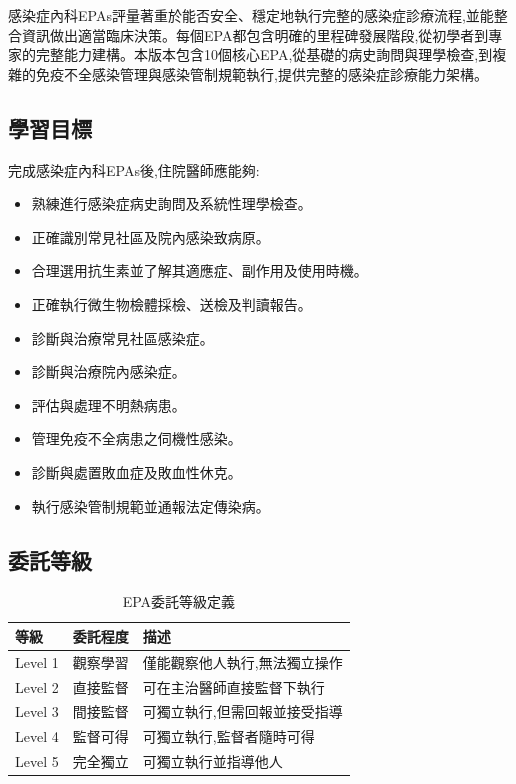 \documentclass[12pt,a4paper]{article}
\newcommand{\note}[1]{
    \par
    \noindent
    \begin{tcolorbox}[
        colback=id_orange!5!white,
        colframe=id_orange,
        title=\textbf{重點提醒},
        fonttitle=\bfseries,
        boxrule=0.5pt,
        arc=3pt,
        left=6pt,
        right=6pt,
        top=6pt,
        bottom=6pt
    ]
    #1
    \end{tcolorbox}
}
\begin{document}
\vspace{0.5cm}
\note{
感染症內科EPAs評量著重於能否安全、穩定地執行完整的感染症診療流程,並能整合資訊做出適當臨床決策。每個EPA都包含明確的里程碑發展階段,從初學者到專家的完整能力建構。本版本包含10個核心EPA,從基礎的病史詢問與理學檢查,到複雜的免疫不全感染管理與感染管制規範執行,提供完整的感染症診療能力架構。
}

\subsection{學習目標}
完成感染症內科EPAs後,住院醫師應能夠:
\begin{itemize}[nosep]
    \item 熟練進行感染症病史詢問及系統性理學檢查。
    \item 正確識別常見社區及院內感染致病原。
    \item 合理選用抗生素並了解其適應症、副作用及使用時機。
    \item 正確執行微生物檢體採檢、送檢及判讀報告。
    \item 診斷與治療常見社區感染症。
    \item 診斷與治療院內感染症。
    \item 評估與處理不明熱病患。
    \item 管理免疫不全病患之伺機性感染。
    \item 診斷與處置敗血症及敗血性休克。
    \item 執行感染管制規範並通報法定傳染病。
\end{itemize}

\subsection{委託等級}
\begin{table}[h]
    \centering
    \caption{EPA委託等級定義}
    \begin{tabular}{p{2cm} p{3cm} p{9cm}}
        \toprule
        \textbf{等級} & \textbf{委託程度} & \textbf{描述} \\
        \midrule
        Level 1 & 觀察學習 & 僅能觀察他人執行,無法獨立操作 \\
        Level 2 & 直接監督 & 可在主治醫師直接監督下執行 \\
        Level 3 & 間接監督 & 可獨立執行,但需回報並接受指導 \\
        Level 4 & 監督可得 & 可獨立執行,監督者隨時可得 \\
        Level 5 & 完全獨立 & 可獨立執行並指導他人 \\
        \bottomrule
    \end{tabular}
\end{table}
\end{document}
